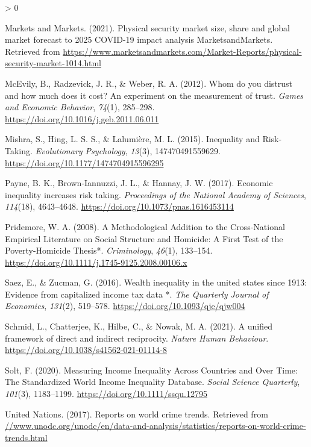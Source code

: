 \documentclass[
  english,
  man]{apa6}
\newlength{\cslhangindent}
\newenvironment{CSLReferences}[2] %
 {%
  \setlength{\parindent}{0pt}
  \ifodd #1 \everypar{\setlength{\hangindent}{\cslhangindent}}\ignorespaces\fi
  \ifnum #2 > 0
  \setlength{\parskip}{#2\baselineskip}
  \fi
 }%
 {}
\begin{document}
\begin{CSLReferences}{1}{0}
\leavevmode\hypertarget{ref-marketsandmarkets2021}{}%
Markets and Markets. (2021). Physical security market size, share and global market forecast to 2025 \textbar{} COVID-19 impact analysis \textbar{} MarketsandMarkets. Retrieved from \url{https://www.marketsandmarkets.com/Market-Reports/physical-security-market-1014.html}

\leavevmode\hypertarget{ref-mcevily2012}{}%
McEvily, B., Radzevick, J. R., \& Weber, R. A. (2012). Whom do you distrust and how much does it cost? An experiment on the measurement of trust. \emph{Games and Economic Behavior}, \emph{74}(1), 285--298. \url{https://doi.org/10.1016/j.geb.2011.06.011}

\leavevmode\hypertarget{ref-mishra2015}{}%
Mishra, S., Hing, L. S. S., \& Lalumière, M. L. (2015). Inequality and Risk-Taking. \emph{Evolutionary Psychology}, \emph{13}(3), 147470491559629. \url{https://doi.org/10.1177/1474704915596295}

\leavevmode\hypertarget{ref-payne2017}{}%
Payne, B. K., Brown-Iannuzzi, J. L., \& Hannay, J. W. (2017). Economic inequality increases risk taking. \emph{Proceedings of the National Academy of Sciences}, \emph{114}(18), 4643--4648. \url{https://doi.org/10.1073/pnas.1616453114}

\leavevmode\hypertarget{ref-pridemore2008}{}%
Pridemore, W. A. (2008). A Methodological Addition to the Cross-National Empirical Literature on Social Structure and Homicide: A First Test of the Poverty-Homicide Thesis*. \emph{Criminology}, \emph{46}(1), 133--154. \url{https://doi.org/10.1111/j.1745-9125.2008.00106.x}

\leavevmode\hypertarget{ref-saez2016}{}%
Saez, E., \& Zucman, G. (2016). Wealth inequality in the united states since 1913: Evidence from capitalized income tax data *. \emph{The Quarterly Journal of Economics}, \emph{131}(2), 519--578. \url{https://doi.org/10.1093/qje/qjw004}

\leavevmode\hypertarget{ref-schmid2021}{}%
Schmid, L., Chatterjee, K., Hilbe, C., \& Nowak, M. A. (2021). A unified framework of direct and indirect reciprocity. \emph{Nature Human Behaviour}. \url{https://doi.org/10.1038/s41562-021-01114-8}

\leavevmode\hypertarget{ref-solt2020}{}%
Solt, F. (2020). Measuring Income Inequality Across Countries and Over Time: The Standardized World Income Inequality Database. \emph{Social Science Quarterly}, \emph{101}(3), 1183--1199. \url{https://doi.org/10.1111/ssqu.12795}

\leavevmode\hypertarget{ref-unitednations2017}{}%
United Nations. (2017). Reports on world crime trends. Retrieved from \href{https:////www.unodc.org/unodc/en/data-and-analysis/statistics/reports-on-world-crime-trends.html}{//www.unodc.org/unodc/en/data-and-analysis/statistics/reports-on-world-crime-trends.html}


\end{CSLReferences}
\end{document}

